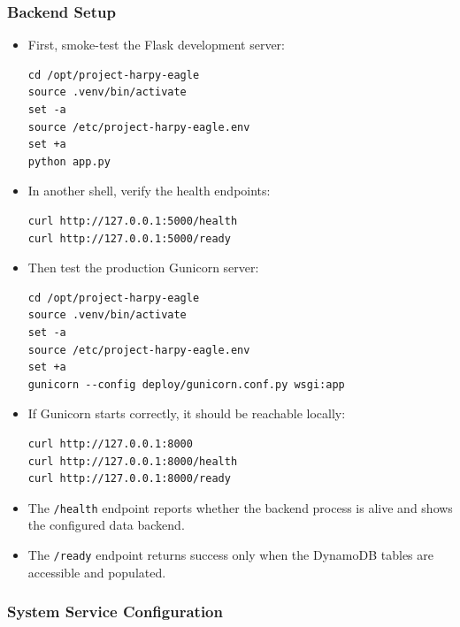 \documentclass[12pt,a4paper]{article}
\begin{document}
\subsubsection{Backend Setup}

\begin{itemize}
    \item First, smoke-test the Flask development server:
\begin{lstlisting}
cd /opt/project-harpy-eagle
source .venv/bin/activate
set -a
source /etc/project-harpy-eagle.env
set +a
python app.py
\end{lstlisting}

    \item In another shell, verify the health endpoints:
\begin{lstlisting}
curl http://127.0.0.1:5000/health
curl http://127.0.0.1:5000/ready
\end{lstlisting}

    \item Then test the production Gunicorn server:
\begin{lstlisting}
cd /opt/project-harpy-eagle
source .venv/bin/activate
set -a
source /etc/project-harpy-eagle.env
set +a
gunicorn --config deploy/gunicorn.conf.py wsgi:app
\end{lstlisting}

    \item If Gunicorn starts correctly, it should be reachable locally:
\begin{lstlisting}
curl http://127.0.0.1:8000
curl http://127.0.0.1:8000/health
curl http://127.0.0.1:8000/ready
\end{lstlisting}

    \item The \texttt{/health} endpoint reports whether the backend process is alive and shows the configured data backend.
    \item The \texttt{/ready} endpoint returns success only when the DynamoDB tables are accessible and populated.
\end{itemize}

\subsubsection{System Service Configuration}
\end{document}
